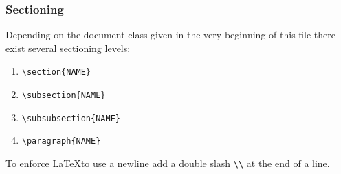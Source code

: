 \documentclass[10pt,a4paper]{scrartcl}
\begin{document}
\subsubsection{Sectioning}
Depending on the document class given in the very beginning of this file there
exist several sectioning levels:
\begin{enumerate}
	\item{} \verb$\section{NAME}$
	\item{} \verb$\subsection{NAME}$
	\item{} \verb$\subsubsection{NAME}$
	\item{} \verb$\paragraph{NAME}$
\end{enumerate}

\noindent To enforce \LaTeX to use a newline add a double slash \verb$\\$ at 
the end of a line.
\end{document}
